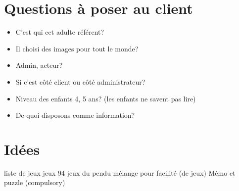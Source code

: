 \documentclass[12pt,a4paper]{report}
\begin{document}
\chapter{Questions à poser au client}

\begin{itemize}
\item C'est qui cet adulte référent? 
\item Il choisi des images pour tout le monde?
\item Admin, acteur? 
\item Si c'est côté client ou côté administrateur? 
\item Niveau des enfants 4, 5 ans? (les enfants ne savent pas lire)
\item De quoi disposons comme information?
\end{itemize}

\chapter{Idées}


liste de jeux
jeux 94
jeux du pendu
mélange pour facilité (de jeux)
Mémo et puzzle (compulsory)





\end{document}
